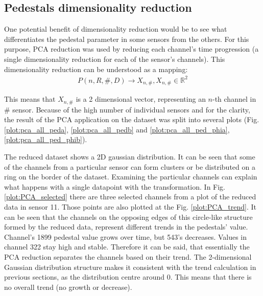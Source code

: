 \subsection{Pedestals dimensionality reduction}

One potential benefit of dimensionality reduction would be to see what differentiates the pedestal parameter in some sensors from the others. For this purpose, PCA reduction was used by reducing each channel's time progression (a single dimensionality reduction for each of the sensor's channels).
This dimensionality reduction can be understood as a mapping:
\begin{align}
  P(n, R, \#, D) \rightarrow X_{n,\#}, X_{n,\#} \in \mathbb{R}^{2}
\end{align}

This means that $X_{n,\#}$ is a 2 dimensional vector, representing an $n$-th channel in $\#$ sensor. 
 Because of the high number of individual sensors and for the clarity, the result of the PCA application on the dataset was split into several plots (Fig. \ref{plot:pca_all_peda}, \ref{plot:pca_all_pedb} and \ref{plot:pca_all_ped_phia}, \ref{plot:pca_all_ped_phib}).

  The reduced dataset shows a 2D gaussian distribution.
  It can be seen that some of the channels from a particular sensor can form clusters or be distributed on a ring on the border of the dataset.
  Examining the particular channels can explain what happens with a single datapoint with the transformation.
  In Fig. \ref{plot:PCA_selected} there are three selected channels from a plot of the reduced data in sensor 11.
  Those points are also plotted at the Fig. \ref{plot:PCA_trend}.
  It can be seen that the channels on the opposing edges of this circle-like structure formed by the reduced data, represent different trends in the pedestals' value.
  Channel's 1899 pedestal value grows over time, but 543's decreases.
  Values in channel 322 stay high and stable.
  Therefore it can be said, that essentially the PCA reduction separates the channels based on their trend.
  The 2-dimensional Gaussian distribution structure makes it consistent with the trend calculation in previous sections, as the distribution centre around 0.
  This means that there is no overall trend (no growth or decrease).
  
